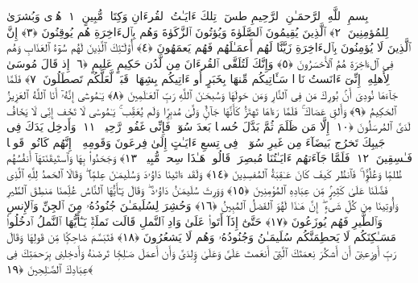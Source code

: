 
  
    
  
    
    

\nopagebreak
  بِسمِ ٱللَّهِ ٱلرَّحمَـٰنِ ٱلرَّحِيمِ
  طسٓ ۚ تِلكَ ءَايَـٰتُ ٱلقُرءَانِ وَكِتَابٍۢ مُّبِينٍ ﴿١﴾
 هُدًۭى وَبُشرَىٰ لِلمُؤمِنِينَ ﴿٢﴾
 ٱلَّذِينَ يُقِيمُونَ ٱلصَّلَوٰةَ وَيُؤتُونَ ٱلزَّكَوٰةَ وَهُم بِٱلءَاخِرَةِ هُم يُوقِنُونَ ﴿٣﴾
 إِنَّ ٱلَّذِينَ لَا يُؤمِنُونَ بِٱلءَاخِرَةِ زَيَّنَّا لَهُم أَعمَـٰلَهُم فَهُم يَعمَهُونَ ﴿٤﴾
 أُو۟لَـٰٓئِكَ ٱلَّذِينَ لَهُم سُوٓءُ ٱلعَذَابِ وَهُم فِى ٱلءَاخِرَةِ هُمُ ٱلأَخسَرُونَ ﴿٥﴾
 وَإِنَّكَ لَتُلَقَّى ٱلقُرءَانَ مِن لَّدُن حَكِيمٍ عَلِيمٍ ﴿٦﴾
 إِذ قَالَ مُوسَىٰ لِأَهلِهِۦٓ إِنِّىٓ ءَانَستُ نَارًۭا سَـَٔاتِيكُم مِّنهَا بِخَبَرٍ أَو ءَاتِيكُم بِشِهَابٍۢ قَبَسٍۢ لَّعَلَّكُم تَصطَلُونَ ﴿٧﴾
 فَلَمَّا جَآءَهَا نُودِىَ أَنۢ بُورِكَ مَن فِى ٱلنَّارِ وَمَن حَولَهَا وَسُبحَـٰنَ ٱللَّهِ رَبِّ ٱلعَـٰلَمِينَ ﴿٨﴾
 يَـٰمُوسَىٰٓ إِنَّهُۥٓ أَنَا ٱللَّهُ ٱلعَزِيزُ ٱلحَكِيمُ ﴿٩﴾
 وَأَلقِ عَصَاكَ ۚ فَلَمَّا رَءَاهَا تَهتَزُّ كَأَنَّهَا جَآنٌّۭ وَلَّىٰ مُدبِرًۭا وَلَم يُعَقِّب ۚ يَـٰمُوسَىٰ لَا تَخَف إِنِّى لَا يَخَافُ لَدَىَّ ٱلمُرسَلُونَ ﴿١٠﴾
 إِلَّا مَن ظَلَمَ ثُمَّ بَدَّلَ حُسنًۢا بَعدَ سُوٓءٍۢ فَإِنِّى غَفُورٌۭ رَّحِيمٌۭ ﴿١١﴾
 وَأَدخِل يَدَكَ فِى جَيبِكَ تَخرُج بَيضَآءَ مِن غَيرِ سُوٓءٍۢ ۖ فِى تِسعِ ءَايَـٰتٍ إِلَىٰ فِرعَونَ وَقَومِهِۦٓ ۚ إِنَّهُم كَانُوا۟ قَومًۭا فَـٰسِقِينَ ﴿١٢﴾
 فَلَمَّا جَآءَتهُم ءَايَـٰتُنَا مُبصِرَةًۭ قَالُوا۟ هَـٰذَا سِحرٌۭ مُّبِينٌۭ ﴿١٣﴾
 وَجَحَدُوا۟ بِهَا وَٱستَيقَنَتهَآ أَنفُسُهُم ظُلمًۭا وَعُلُوًّۭا ۚ فَٱنظُر كَيفَ كَانَ عَـٰقِبَةُ ٱلمُفسِدِينَ ﴿١٤﴾
 وَلَقَد ءَاتَينَا دَاوُۥدَ وَسُلَيمَـٰنَ عِلمًۭا ۖ وَقَالَا ٱلحَمدُ لِلَّهِ ٱلَّذِى فَضَّلَنَا عَلَىٰ كَثِيرٍۢ مِّن عِبَادِهِ ٱلمُؤمِنِينَ ﴿١٥﴾
 وَوَرِثَ سُلَيمَـٰنُ دَاوُۥدَ ۖ وَقَالَ يَـٰٓأَيُّهَا ٱلنَّاسُ عُلِّمنَا مَنطِقَ ٱلطَّيرِ وَأُوتِينَا مِن كُلِّ شَىءٍ ۖ إِنَّ هَـٰذَا لَهُوَ ٱلفَضلُ ٱلمُبِينُ ﴿١٦﴾
 وَحُشِرَ لِسُلَيمَـٰنَ جُنُودُهُۥ مِنَ ٱلجِنِّ وَٱلإِنسِ وَٱلطَّيرِ فَهُم يُوزَعُونَ ﴿١٧﴾
 حَتَّىٰٓ إِذَآ أَتَوا۟ عَلَىٰ وَادِ ٱلنَّملِ قَالَت نَملَةٌۭ يَـٰٓأَيُّهَا ٱلنَّملُ ٱدخُلُوا۟ مَسَـٰكِنَكُم لَا يَحطِمَنَّكُم سُلَيمَـٰنُ وَجُنُودُهُۥ وَهُم لَا يَشعُرُونَ ﴿١٨﴾
 فَتَبَسَّمَ ضَاحِكًۭا مِّن قَولِهَا وَقَالَ رَبِّ أَوزِعنِىٓ أَن أَشكُرَ نِعمَتَكَ ٱلَّتِىٓ أَنعَمتَ عَلَىَّ وَعَلَىٰ وَٟلِدَىَّ وَأَن أَعمَلَ صَـٰلِحًۭا تَرضَىٰهُ وَأَدخِلنِى بِرَحمَتِكَ فِى عِبَادِكَ ٱلصَّـٰلِحِينَ ﴿١٩﴾
